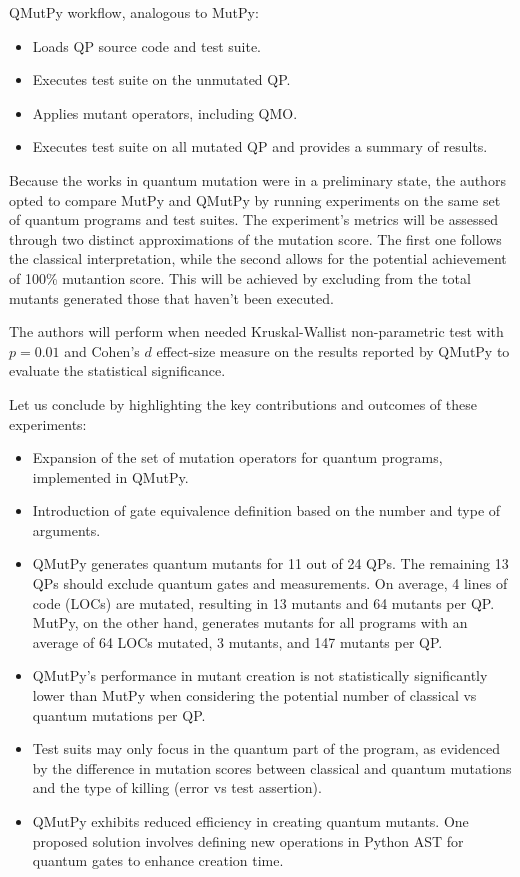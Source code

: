 \begin{itemize}
QMutPy workflow, analogous to MutPy:
\begin{itemize}
    \item Loads QP source code and test suite.
    \item Executes test suite on the unmutated QP.
    \item Applies mutant operators, including QMO.
    \item Executes test suite on all mutated QP and provides a summary of results.
\end{itemize}

Because the works in quantum mutation \cite{wang2021qdiff}\cite{mendiluze2021muskit}\cite{ali2021assessing} were in a preliminary state, the authors opted to compare MutPy and QMutPy by running experiments on the same set of quantum programs and test suites. The experiment's metrics will be assessed through two distinct approximations of the mutation score. The first one follows the classical interpretation\cite{jia2010analysis}, while the second allows for the potential achievement of 100\% mutantion score. This will be achieved by excluding from the total mutants generated those that haven't been executed.\newline

The authors will perform when needed Kruskal-Wallist non-parametric test with $p=0.01$ and Cohen's $d$ effect-size measure on the results reported by QMutPy to evaluate the statistical significance.\newline

Let us conclude by highlighting the key contributions and outcomes of these experiments:

\begin{itemize}
    \item Expansion of the set of mutation operators for quantum programs, implemented in QMutPy.
    \item Introduction of gate equivalence definition based on the number and type of arguments.
    \item QMutPy generates quantum mutants for 11 out of 24 QPs. The remaining 13 QPs should exclude quantum gates and measurements. On average, 4 lines of code (LOCs) are mutated, resulting in 13 mutants and 64 mutants per QP. MutPy, on the other hand, generates mutants for all programs with an average of 64 LOCs mutated, 3 mutants, and 147 mutants per QP.
    \item QMutPy's performance in mutant creation is not statistically significantly lower than MutPy when considering the potential number of classical vs quantum mutations per QP.
    \item Test suits may only focus in the quantum part of the program, as evidenced by the difference in mutation scores between classical and quantum mutations and the type of killing (error vs test assertion).
    \item QMutPy exhibits reduced efficiency in creating quantum mutants. One proposed solution involves defining new operations in Python AST for quantum gates to enhance creation time.
\end{itemize}


\end{itemize}
